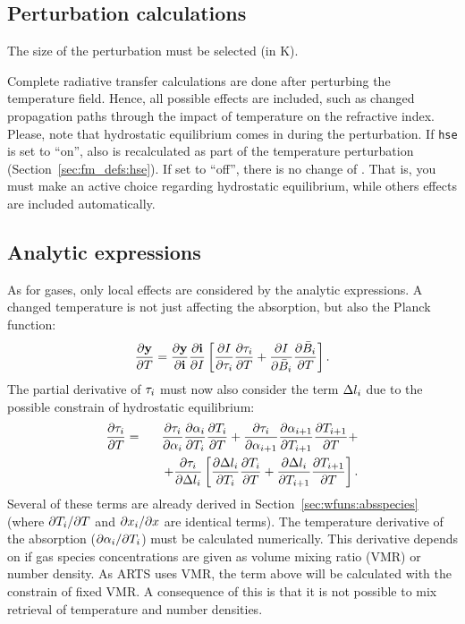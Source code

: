 \subsection{Perturbation calculations}
%
The size of the perturbation must be selected (in K).

Complete radiative transfer calculations are done after perturbing the
temperature field. Hence, all possible effects are included, such as changed
propagation paths through the impact of temperature on the refractive index.
Please, note that hydrostatic equilibrium comes in during the perturbation. If
\verb|hse| is set to ``on'', also  is recalculated as part
of the temperature perturbation (Section~\ref{sec:fm_defs:hse}). If set to
``off'', there is no change of . That is, you must make an
active choice regarding hydrostatic equilibrium, while others effects are
included automatically.


\subsection{Analytic expressions}
%
As for gases, only local effects are considered by the analytic expressions.
A changed temperature is not just affecting the absorption, but also the Planck
function:
\begin{equation}
  \frac{\partial \mathbf{y}}{\partial T} =  
  \frac{\partial \mathbf{y}}{\partial \mathbf{i}} \frac{\partial \mathbf{i}}{\partial I} 
  \left[
  \frac{\partial I}{\partial \tau_{i}}\frac{\partial \tau_{i}}{\partial T} + 
  \frac{\partial I}{\partial \bar{B}_i}
  \frac{\partial \bar{B}_i}{\partial T} \right].
 \label{eq:wfuns:t1}
\end{equation}
The partial derivative of $\tau_{i}$ must now also consider the term $\Delta
l_{i}$ due to the possible constrain of hydrostatic equilibrium:
\begin{eqnarray}
  \frac{\partial \tau_{i}}{\partial T} &=&
  \frac{\partial \tau_{i}}{\partial {\alpha}_{i}}
  \frac{\partial {\alpha}_{i}}{\partial T_{i}} 
  \frac{\partial T_{i}}{\partial T} +
  \frac{\partial \tau_{i}}{\partial {\alpha}_{i+1}}
  \frac{\partial {\alpha}_{i+1}}{\partial T_{i+1}}
  \frac{\partial T_{i+1}}{\partial T} + \nonumber \\ &&
  \quad + \frac{\partial \tau_{i}}{\partial \Delta l_{i}}
  \left[
    \frac{\partial \Delta l_{i}}{\partial T_{i}} \frac{\partial T_i}{\partial T} +
    \frac{\partial \Delta l_{i}}{\partial T_{i+1}} \frac{\partial T_{i+1}}{\partial T}
  \right].
\end{eqnarray}
Several of these terms are already derived in
Section~\ref{sec:wfuns:absspecies} (where $\partial T_{i}/\partial T$ and
$\partial x_{i}/\partial x$ are identical terms). The temperature
derivative of the absorption ($\partial{\alpha}_{i}/\partial T_{i}$) must be
calculated numerically. This derivative depends on if gas species
concentrations are given as volume mixing ratio (VMR) or number density. As
ARTS uses VMR, the term above will be calculated with the constrain of fixed
VMR. A consequence of this is that it is not possible to mix retrieval of
temperature and number densities.

